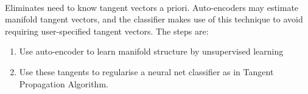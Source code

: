 \begin{remark} \\
Eliminates need to know tangent vectors a priori. Auto-encoders may estimate manifold tangent vectors, and the classifier makes use of this technique to avoid requiring user-specified tangent vectors. The steps are:
\begin{enumerate}[label=\roman*.]
\setlength{\itemsep}{0pt}
\item Use auto-encoder to learn manifold structure by unsupervised learning
\item Use these tangents to regularise a neural net classifier as in Tangent Propagation Algorithm.
\end{enumerate}
\end{remark}
